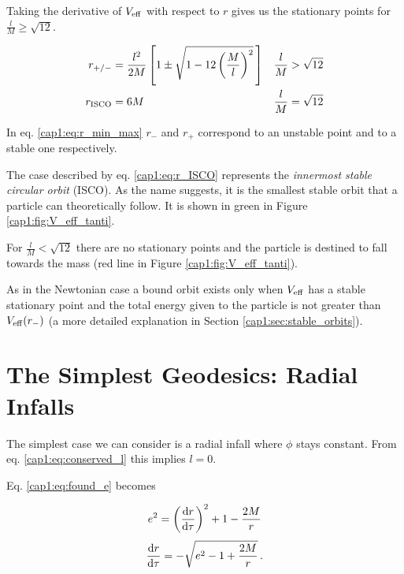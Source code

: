Taking the derivative of $V_{\rm eff}$ with respect to $r$ gives us the
stationary points for $\frac{l}{M} \geq \sqrt{12}$.

\begin{subequations}
\begin{align}
    r_{+ / -} &= \frac{l^2}{2 M} \left[1 \pm
    \sqrt{1 - 12 \left( \frac{M}{l} \right)^2} \, \right]
    &&\frac{l}{M} > \sqrt{12} \label{cap1:eq:r_min_max} \\
    r_{\rm ISCO} &= 6 M
    &&\frac{l}{M} = \sqrt{12} \label{cap1:eq:r_ISCO}
\end{align}
\label{cap1:eq:stationary_r}
\end{subequations}

In eq. \ref{cap1:eq:r_min_max} $r_-$ and $r_+$ correspond
to an unstable point and to a stable one respectively.

The case described by eq. \ref{cap1:eq:r_ISCO} represents the
\textit{innermost stable circular orbit} (ISCO).
As the name suggests, it is the smallest stable orbit that a particle can
theoretically follow.
It is shown in green in Figure \ref{cap1:fig:V_eff_tanti}.

For $\frac{l}{M} < \sqrt{12}$ there are no stationary points and the particle
is destined to fall towards the mass (red line in Figure
\ref{cap1:fig:V_eff_tanti}).

As in the Newtonian case a bound orbit exists only when $V_{\rm eff}$ has a
stable stationary point and the total energy given to the particle is not
greater than $V_{\rm eff}(r_-)$ (a more detailed explanation in
Section \ref{cap1:sec:stable_orbits}).

\newpage


\section{The Simplest Geodesics: Radial Infalls}

The simplest case we can consider is a radial infall where $\phi$ stays
constant.
From eq. \ref{cap1:eq:conserved_l} this implies $l = 0$.

Eq. \ref{cap1:eq:found_e} becomes


\begin{equation*}
    e^2 = \left(\dv{r}{\tau}\right)^2 + 1 - \frac{2M}{r}
\end{equation*}
\begin{equation}
    \dv{r}{\tau} = - \sqrt{e^2 - 1 + \frac{2 M}{r}} \, .
    \label{cap1:eq:radial_infall_ODE_1}
\end{equation}

